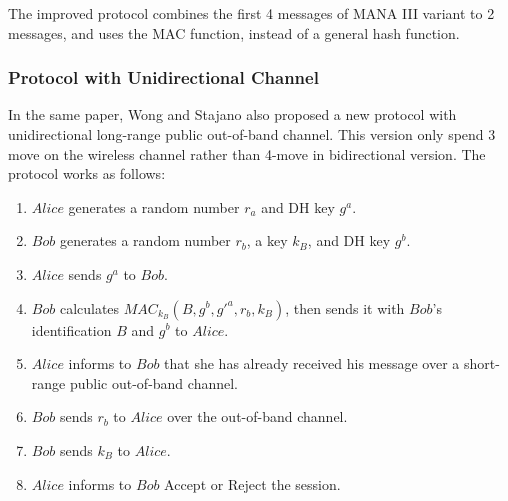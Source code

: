The improved protocol combines the first 4 messages of MANA III variant to 2 messages, and uses the MAC function, instead of a general hash function. 
 
\subsubsection*{Protocol with Unidirectional Channel}

In the same paper, Wong and Stajano also proposed a new protocol with unidirectional long-range public out-of-band channel. This version only spend 3 move on the wireless channel rather than 4-move in bidirectional version. The protocol works as follows:
\begin{enumerate}
\item $Alice$ generates a random number $r_a$ and DH key $g^a$.
\item $Bob$ generates a random number $r_b$, a key $k_B$, and DH key $g^b$.
\item $Alice$ sends $g^a$ to $Bob$. 
\item $Bob$ calculates $MAC_{k_B}(B,g^b,g'^a,r_b,k_B)$, then sends it with $Bob$'s identification $B$ and $g^b$ to $Alice$.
\item $Alice$ informs to $Bob$ that she has already received his message over a short-range public out-of-band channel. 
\item $Bob$ sends $r_b$ to $Alice$ over the out-of-band channel. 
\item $Bob$ sends $k_B$ to $Alice$. 
\item $Alice$ informs to $Bob$ Accept or Reject the session.
\end{enumerate}


